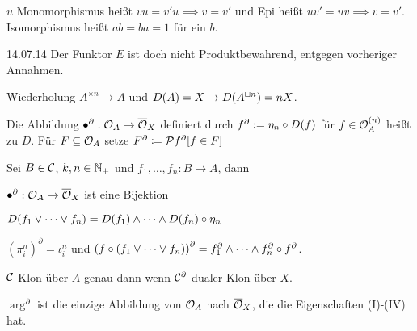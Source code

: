 \documentclass{book}
\begin{document}
\begin{solution}
    $u$ Monomorphismus heißt $vu=v'u\implies v=v'$ und Epi heißt $uv'=uv\implies v=v'$. Isomorphismus heißt $ab=ba=1$ für ein $b$.
\end{solution}

\hfill{14.07.14}
%
Der Funktor $E$ ist doch nicht Produktbewahrend, entgegen vorheriger Annahmen.

Wiederholung $A^{\times n}\to A$ und $D(A)=X\rightarrow D(A^{\mathbin{\sqcup} n})=n X$.

\begin{definition}
    Die Abbildung $\bullet^\partial:\mathcal{O}_A\rightarrow\overline {\mathcal{O}}_X$ definiert durch $f^\partial:=\eta_n\circ D(f)$ für $f\in\mathcal{O}_A^{(n)}$ heißt  zu $D$. Für $F\subseteq \mathcal{O}_A$ setze $F^\partial \defeq\set{f^\partial}[f\in F]$
\end{definition}

\begin{lemma}
    Sei $B\in \mathcal{C}$, $k,n\in\mathbb{N}_+$ und $f_1,\ldots,f_n:B\to A$, dann
    \begin{statements}
            \item $\bullet^\partial:\mathcal{O}_A\rightarrow\overline{\mathcal{O}}_X$ ist eine Bijektion
            \item $D(f_1\vee \cdots\vee f_n)=D(f_1)\wedge\cdots\wedge D(f_n)\circ \eta_n$
            \item ${(\pi_i^n)}^\partial=\iota_i^n$ und ${(f\circ(f_1\vee\cdots\vee f_n))}^{\partial}=f_1^\partial\wedge \cdots \wedge f^\partial_n\circ f^\partial$.
            \item $\mathcal{C}$ Klon über $A$ genau dann wenn $\mathcal{C}^\partial$ dualer Klon über $X$.
        \item $\arg^\partial$ ist die einzige Abbildung von $\mathcal{O}_A$ nach $\overline{\mathcal{O}}_X$, die die Eigenschaften (I)-(IV) hat.
    \end{statements}
\end{lemma}
\end{document}
